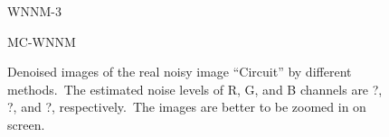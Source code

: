 \begin{figure}
{\begin{minipage}[t]{0.19\textwidth}
{\footnotesize WNNM-3 }
\end{minipage}
\begin{minipage}[t]{0.19\textwidth}
\centering
{}
{\footnotesize MC-WNNM }
\end{minipage}
}
    \caption{Denoised images of the real noisy image ``Circuit'' \cite{ncwebsite} by different methods.\ The estimated noise levels of R, G, and B channels are ?, ?, and ?, respectively.\ The images are better to be zoomed in on screen.}
    \label{fig4-11}
\end{figure}


